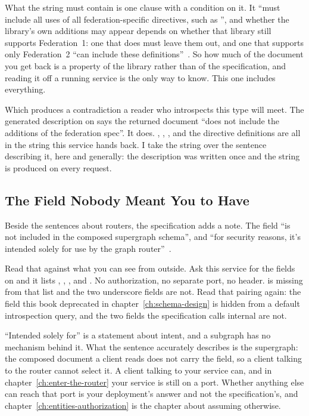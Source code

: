 %
What the string must contain is one clause with a condition on it. It
\enquote{must include all uses of all federation-specific directives, such as
}, and whether the library's own additions may appear depends on
whether that library still supports Federation~1: one that does must leave them
out, and one that supports only Federation~2 \enquote{can include these
definitions}~\autocite{apollosubgraphspec}. So how much of the document you get
back is a property of the library rather than of the specification, and reading
it off a running service is the only way to know. This one includes everything.

%
Which produces a contradiction a reader who introspects this type will meet.
The generated description on  says the returned document
\enquote{does not include the additions of the federation spec}. It does.
, , ,  and the
directive definitions are all in the string this service hands back. I take the
string over the sentence describing it, here and generally: the description was
written once and the string is produced on every request.

\subsection{The Field Nobody Meant You to Have}

%
Beside the sentences about routers, the specification adds a note. The field
\enquote{is not included in the composed supergraph schema}, and \enquote{for
security reasons, it's intended solely for use by the graph
router}~\autocite{apollosubgraphspec}.

%
Read that against what you can see from outside. Ask this service for the fields
on  and it lists , , ,
 and . No authorization, no separate port, no
header.  is missing from that list and the two underscore
fields are not. Read that pairing again: the field this book deprecated in
chapter~\ref{ch:schema-design} is hidden from a default introspection query, and
the two fields the specification calls internal are not.

%
\enquote{Intended solely for} is a statement about intent, and a subgraph has no
mechanism behind it. What the sentence accurately describes is the supergraph:
the composed document a client reads does not carry the field, so a client
talking to the router cannot select it. A client talking to your service can, and
in chapter~\ref{ch:enter-the-router} your service is still on a port. Whether
anything else can reach that port is your deployment's answer and not the
specification's, and chapter~\ref{ch:entities-authorization} is the chapter about
assuming otherwise.
%
